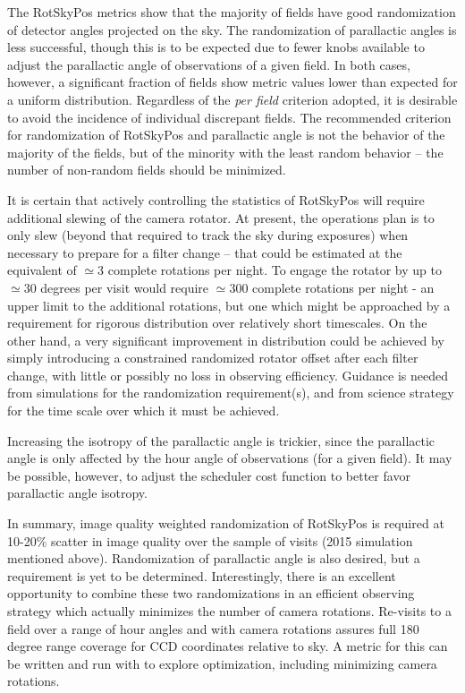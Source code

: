 The RotSkyPos metrics show that the majority of fields have good randomization
of detector angles projected on the sky.  The randomization of parallactic
angles is less successful, though this is to be expected due to fewer knobs
available to adjust the parallactic angle of observations of a given field.  In
both cases, however, a significant fraction of fields show metric values lower
than expected for a uniform distribution.  Regardless of the \emph{per field}
criterion adopted, it is desirable to avoid the incidence of individual
discrepant fields.  The recommended criterion for randomization of RotSkyPos and
parallactic angle is not the behavior of the majority of the fields, but of the
minority with the least random behavior -- the number of non-random fields
should be minimized.

It is certain that actively controlling the statistics of RotSkyPos will require
additional slewing of the camera rotator.  At present, the operations plan is to
only slew (beyond that required to track the sky during exposures) when
necessary to prepare for a filter change -- that could be estimated at the
equivalent of $\simeq 3$ complete rotations per night.  To engage the rotator by
up to $\simeq 30$ degrees per visit would require $\simeq 300$ complete
rotations per night - an upper limit to the additional rotations, but one which might be approached by a requirement for
rigorous distribution over relatively short timescales.  On the other hand, a very significant improvement
in distribution could be achieved by simply introducing a constrained randomized rotator
offset after each filter change, with little or possibly no loss in observing efficiency.
Guidance is needed from simulations for the randomization requirement(s), and from science strategy
for the time scale over which it must be achieved.

Increasing the isotropy of the parallactic angle is trickier, since the
parallactic angle is only affected by the hour angle of observations (for a
given field).  It may be possible, however, to adjust the scheduler cost
function to better favor parallactic angle isotropy.

In summary, image quality weighted randomization of RotSkyPos is required at
10-20\% scatter in image quality over the sample of visits (2015 simulation
mentioned above).  Randomization of parallactic angle is also desired, but a
requirement is yet to be determined.  Interestingly, there is an excellent
opportunity to combine these two randomizations in an efficient observing
strategy which actually minimizes the number of camera rotations.  Re-visits to
a field over a range of hour angles and with camera rotations assures full 180
degree range coverage for CCD coordinates relative to sky.  A metric for this
can be written and run with \OpSim to explore optimization, including minimizing
camera rotations.

